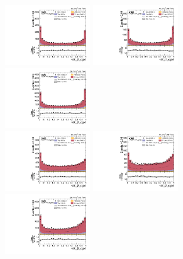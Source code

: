 \begin{figure}[!ht]
  \centering
  \includegraphics[width=0.33\textwidth]{analysis_plots/2016_zjj/sr_l/vbf_j1_qgid.pdf} \hspace{-10pt}
  \includegraphics[width=0.33\textwidth]{analysis_plots/2017_zjj/sr_l/vbf_j1_qgid.pdf} \hspace{-10pt}
  \includegraphics[width=0.33\textwidth]{analysis_plots/2018_zjj/sr_l/vbf_j1_qgid.pdf} \hspace{-10pt}  \\
  \includegraphics[width=0.33\textwidth]{analysis_plots/2016_zjj/sr_l/vbf_j2_qgid.pdf} \hspace{-10pt}
  \includegraphics[width=0.33\textwidth]{analysis_plots/2017_zjj/sr_l/vbf_j2_qgid.pdf} \hspace{-10pt}
  \includegraphics[width=0.33\textwidth]{analysis_plots/2018_zjj/sr_l/vbf_j2_qgid.pdf} \hspace{-10pt}  \\

\end{figure}

